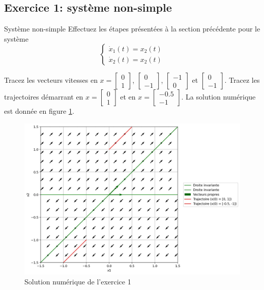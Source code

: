         \subsection{Exercice 1: système non-simple}
            \begin{exercise}{Système non-simple}
                Effectuez les étapes présentées à la section précédente pour le système
                \begin{equation}
                    \begin{cases}
                        \dot{x}_1(t) = x_2(t)\\
                        \dot{x}_2(t) = x_2(t)
                    \end{cases}
                \end{equation}
            \end{exercise}
            Tracez les vecteurs vitesses en $x = \begin{bmatrix}0 \\ 1\end{bmatrix}$, $\begin{bmatrix}0 \\ -1\end{bmatrix}$, $\begin{bmatrix}-1 \\ 0\end{bmatrix}$ et $\begin{bmatrix}0 \\ -1\end{bmatrix}$. Tracez les trajectoires démarrant en $x = \begin{bmatrix}0 \\ 1\end{bmatrix}$ et en $x = \begin{bmatrix}-0.5 \\ -1\end{bmatrix}$.
            La solution numérique est donnée en figure \ref{fig:pdp_exercice_2_1}.
            \begin{figure}[ht!]
                \centering
                \includegraphics[width=\textwidth]{images/pdp_exercice_2_1.jpg}
                \caption{Solution numérique de l'exercice 1}
                \label{fig:pdp_exercice_2_1}
            \end{figure}


